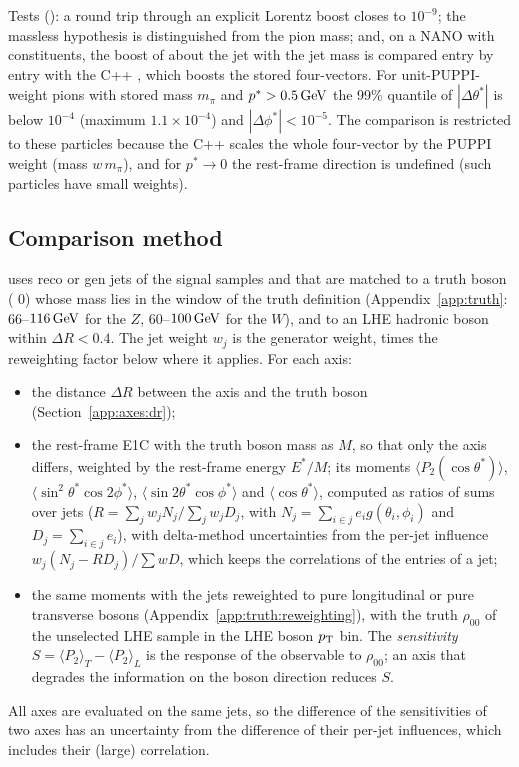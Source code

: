 Tests (): a round trip through an explicit Lorentz boost closes to $10^{-9}$; the
massless hypothesis is distinguished from the pion mass; and, on a NANO with constituents, the boost of 
about the jet with the jet mass is compared entry by entry with the C++ , which boosts the stored
four-vectors. For unit-PUPPI-weight pions with stored mass $m_\pi$ and $p^* > 0.5\,\mathrm{GeV}$ the 99\% quantile of
$|\Delta\theta^*|$ is below $10^{-4}$ (maximum $1.1\times10^{-4}$) and $|\Delta\phi^*| < 10^{-5}$. The comparison is
restricted to these particles because the C++ scales the whole four-vector by the PUPPI weight (mass $w\,m_\pi$), and
for $p^* \to 0$ the rest-frame direction is undefined (such particles have small weights).

\subsection{Comparison method}
\label{app:axes:method}
 uses reco or gen jets of the signal samples  and  that are
matched to a truth boson ( 0) whose mass lies in the window of the truth definition
(Appendix~\ref{app:truth}: $66$--$116\,\mathrm{GeV}$ for the $Z$, $60$--$100\,\mathrm{GeV}$ for the $W$), and to an LHE hadronic boson within
$\Delta R < 0.4$. The jet weight $w_j$ is the generator weight, times the reweighting factor below where it applies. For
each axis:
\begin{itemize}
\item the distance $\Delta R$ between the axis and the truth boson (Section~\ref{app:axes:dr});
\item the rest-frame E1C with the truth boson mass as $M$, so that only the axis differs, weighted by the rest-frame
  energy $E^*/M$; its moments $\langle P_2(\cos\theta^*)\rangle$, $\langle\sin^2\theta^*\cos2\phi^*\rangle$,
  $\langle\sin2\theta^*\cos\phi^*\rangle$ and $\langle\cos\theta^*\rangle$, computed as ratios of sums over jets
  ($R = \sum_j w_j N_j / \sum_j w_j D_j$, with $N_j = \sum_{i\in j} e_i g(\theta_i,\phi_i)$ and $D_j = \sum_{i\in j} e_i$),
  with delta-method uncertainties from the per-jet influence $w_j(N_j - R D_j)/\sum w D$, which keeps the correlations
  of the entries of a jet;
\item the same moments with the jets reweighted to pure longitudinal or pure transverse bosons
  (Appendix~\ref{app:truth:reweighting}), with the truth $\rho_{00}$ of the unselected LHE sample in the LHE boson $p_{\mathrm{T}}$
  bin. The \emph{sensitivity} $S = \langle P_2\rangle_T - \langle P_2\rangle_L$ is the response of the observable to
  $\rho_{00}$; an axis that degrades the information on the boson direction reduces $S$.
\end{itemize}
All axes are evaluated on the same jets, so the difference of the sensitivities of two axes has an uncertainty from
the difference of their per-jet influences, which includes their (large) correlation.

